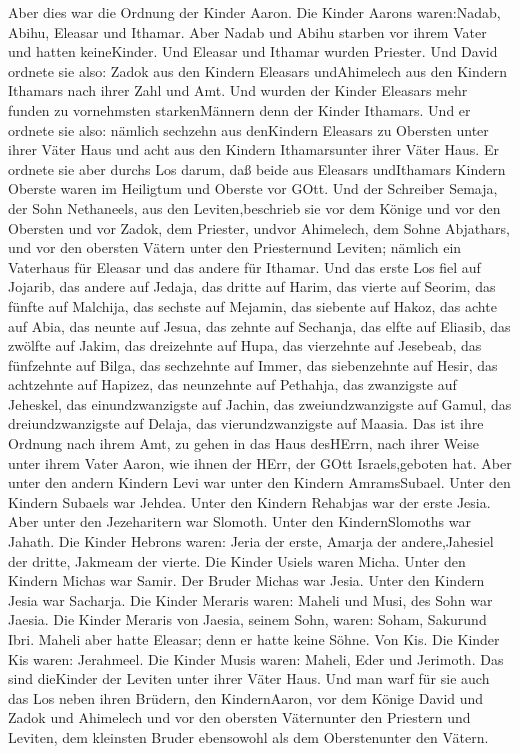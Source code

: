  Aber dies war die Ordnung der Kinder Aaron. Die Kinder
Aarons waren:Nadab, Abihu, Eleasar und Ithamar.  Aber Nadab
und Abihu starben vor ihrem Vater und hatten keineKinder. Und Eleasar
und Ithamar wurden Priester.  Und David ordnete sie also:
Zadok aus den Kindern Eleasars undAhimelech aus den Kindern Ithamars
nach ihrer Zahl und Amt.  Und wurden der Kinder Eleasars
mehr funden zu vornehmsten starkenMännern denn der Kinder Ithamars. Und
er ordnete sie also: nämlich sechzehn aus denKindern Eleasars zu
Obersten unter ihrer Väter Haus und acht aus den Kindern Ithamarsunter
ihrer Väter Haus.  Er ordnete sie aber durchs Los darum, daß
beide aus Eleasars undIthamars Kindern Oberste waren im Heiligtum und
Oberste vor GOtt.  Und der Schreiber Semaja, der Sohn
Nethaneels, aus den Leviten,beschrieb sie vor dem Könige und vor den
Obersten und vor Zadok, dem Priester, undvor Ahimelech, dem Sohne
Abjathars, und vor den obersten Vätern unter den Priesternund Leviten;
nämlich ein Vaterhaus für Eleasar und das andere für Ithamar.
 Und das erste Los fiel auf Jojarib, das andere auf Jedaja,
 das dritte auf Harim, das vierte auf Seorim, 
das fünfte auf Malchija, das sechste auf Mejamin,  das
siebente auf Hakoz, das achte auf Abia,  das neunte auf
Jesua, das zehnte auf Sechanja,  das elfte auf Eliasib, das
zwölfte auf Jakim,  das dreizehnte auf Hupa, das vierzehnte
auf Jesebeab,  das fünfzehnte auf Bilga, das sechzehnte auf
Immer,  das siebenzehnte auf Hesir, das achtzehnte auf
Hapizez,  das neunzehnte auf Pethahja, das zwanzigste auf
Jeheskel,  das einundzwanzigste auf Jachin, das
zweiundzwanzigste auf Gamul,  das dreiundzwanzigste auf
Delaja, das vierundzwanzigste auf Maasia.  Das ist ihre
Ordnung nach ihrem Amt, zu gehen in das Haus desHErrn, nach ihrer Weise
unter ihrem Vater Aaron, wie ihnen der HErr, der GOtt Israels,geboten
hat.  Aber unter den andern Kindern Levi war unter den
Kindern AmramsSubael. Unter den Kindern Subaels war Jehdea.
 Unter den Kindern Rehabjas war der erste Jesia.
 Aber unter den Jezeharitern war Slomoth. Unter den
KindernSlomoths war Jahath.  Die Kinder Hebrons waren:
Jeria der erste, Amarja der andere,Jahesiel der dritte, Jakmeam der
vierte.  Die Kinder Usiels waren Micha. Unter den Kindern
Michas war Samir.  Der Bruder Michas war Jesia. Unter den
Kindern Jesia war Sacharja.  Die Kinder Meraris waren:
Maheli und Musi, des Sohn war Jaesia.  Die Kinder Meraris
von Jaesia, seinem Sohn, waren: Soham, Sakurund Ibri. 
Maheli aber hatte Eleasar; denn er hatte keine Söhne.  Von
Kis. Die Kinder Kis waren: Jerahmeel.  Die Kinder Musis
waren: Maheli, Eder und Jerimoth. Das sind dieKinder der Leviten unter
ihrer Väter Haus.  Und man warf für sie auch das Los neben
ihren Brüdern, den KindernAaron, vor dem Könige David und Zadok und
Ahimelech und vor den obersten Väternunter den Priestern und Leviten,
dem kleinsten Bruder ebensowohl als dem Oberstenunter den Vätern.

